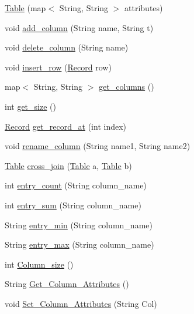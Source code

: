 \begin{DoxyCompactItemize}
\item 
\hyperlink{class_table_a5e0b096386813ba8cceaa7f94b763449}{Table} (map$<$ String, String $>$ attributes)
\item 
void \hyperlink{class_table_a470d64f308cd1e845e58a4d13f18369b}{add\-\_\-column} (String name, String t)
\item 
void \hyperlink{class_table_aeefd19d55dc64eeaecb178b07f71a7fb}{delete\-\_\-column} (String name)
\item 
void \hyperlink{class_table_abce2e0084e3366ce6bc9566e0c84cd8f}{insert\-\_\-row} (\hyperlink{class_record}{Record} row)
\item 
map$<$ String, String $>$ \hyperlink{class_table_a91166bea29254f6113d602b208e82a15}{get\-\_\-columns} ()
\item 
int \hyperlink{class_table_a3adee5d206107494e1ad602a435b4af3}{get\-\_\-size} ()
\item 
\hyperlink{class_record}{Record} \hyperlink{class_table_ad701fba9dea544b0da3ae790154251da}{get\-\_\-record\-\_\-at} (int index)
\item 
void \hyperlink{class_table_af56cbc68307d0b6d45204fe1d3491a83}{rename\-\_\-column} (String name1, String name2)
\item 
\hyperlink{class_table}{Table} \hyperlink{class_table_a91c3b362549e478dd07d07584765c69f}{cross\-\_\-join} (\hyperlink{class_table}{Table} a, \hyperlink{class_table}{Table} b)
\item 
int \hyperlink{class_table_a04102405af408ff40368546fc4d542fc}{entry\-\_\-count} (String column\-\_\-name)
\item 
int \hyperlink{class_table_a54b05026fa1e20aba8ff8dd5fb7012a9}{entry\-\_\-sum} (String column\-\_\-name)
\item 
String \hyperlink{class_table_a2add8bfb0ebfb6776de2c138e7adec40}{entry\-\_\-min} (String column\-\_\-name)
\item 
String \hyperlink{class_table_a60ea93a9d26eb80d0f4e5aa876ff4651}{entry\-\_\-max} (String column\-\_\-name)
\item 
int \hyperlink{class_table_a820e752f7d052238cb7a6d297a7c194b}{Column\-\_\-size} ()
\item 
String \hyperlink{class_table_a721b774120dcaea13e1469f5caa23c4f}{Get\-\_\-\-Column\-\_\-\-Attributes} ()
\item 
void \hyperlink{class_table_a5444b289be0a5a48abf295a0c45c55d6}{Set\-\_\-\-Column\-\_\-\-Attributes} (String Col)
\end{DoxyCompactItemize}



